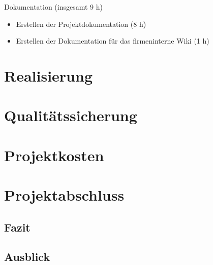 \documentclass[11pt,a4paper,titlepage=firstiscover]{scrartcl} %
\begin{document}
Dokumentation (insgesamt 9 h)
\begin{itemize}
\item Erstellen der Projektdokumentation (8 h)
\item Erstellen der Dokumentation für das firmeninterne Wiki (1 h)
\end{itemize}

\newpage
\section{Realisierung}
\section{Qualit\"atssicherung}
\section{Projektkosten}
\section{Projektabschluss}
\subsection{Fazit}
\subsection{Ausblick}


%
%
\end{document}
